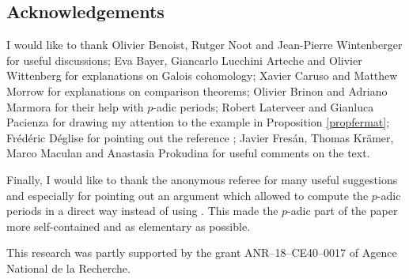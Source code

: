 \subsection*{Acknowledgements}
I would like to thank  Olivier Benoist,  Rutger Noot and Jean-Pierre Wintenberger for useful discussions; Eva Bayer, Giancarlo Lucchini Arteche and Olivier Wittenberg for explanations on  Galois cohomology; Xavier Caruso and Matthew Morrow for explanations on comparison theorems;   Olivier Brinon and Adriano Marmora for their help with $p$-adic periods; Robert Laterveer and Gianluca Pacienza for drawing my attention to the example in Proposition  \ref{propfermat}; Fr\'ed\'eric D\'eglise for pointing out the reference \cite{NiziFred}; Javier Fres\'an, Thomas Kr\"amer, Marco Maculan and Anastasia Prokudina for useful comments on the text.

Finally, I would like to thank the anonymous referee for many useful suggestions and especially for pointing out an argument which allowed to compute the $p$-adic periods in a direct way instead of using \cite[\S 9]{Colmez}. This made the $p$-adic part of the paper more self-contained and as elementary as possible.

This research was partly supported by the grant ANR--18--CE40--0017 of Agence National de la Recherche.
